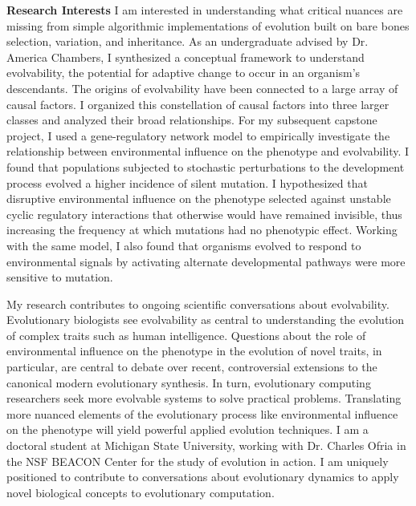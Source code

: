 \textbf{Research Interests}
I am interested in understanding what critical nuances are missing from simple algorithmic implementations of evolution built on bare bones selection, variation, and inheritance.
As an undergraduate advised by Dr. America Chambers, I synthesized a conceptual framework to understand evolvability, the potential for adaptive change to occur in an organism's descendants.
The origins of evolvability have been connected to a large array of causal factors.
I organized this constellation of causal factors into three larger classes and analyzed their broad relationships.
For my subsequent capstone project, I used a gene-regulatory network model to empirically investigate the relationship between environmental influence on the phenotype and evolvability.
I found that populations subjected to stochastic perturbations to the development process evolved a higher incidence of silent mutation.
I hypothesized that disruptive environmental influence on the phenotype selected against unstable cyclic regulatory interactions that otherwise would have remained invisible, thus increasing the frequency at which mutations had no phenotypic effect.
Working with the same model, I also found that organisms evolved to respond to environmental signals by activating alternate developmental pathways were more sensitive to mutation.

My research contributes to ongoing scientific conversations about evolvability.
Evolutionary biologists see evolvability as central to understanding the evolution of complex traits such as human intelligence.
Questions about the role of environmental influence on the phenotype in the evolution of novel traits, in particular, are central to debate over recent, controversial extensions to the canonical modern evolutionary synthesis.
In turn, evolutionary computing researchers seek more evolvable systems to solve practical problems.
Translating more nuanced elements of the evolutionary process like environmental influence on the phenotype will yield powerful applied evolution techniques.
I am a doctoral student at Michigan State University, working with Dr. Charles Ofria in the NSF BEACON Center for the study of evolution in action.
I am uniquely positioned to contribute to conversations about evolutionary dynamics to apply novel biological concepts to evolutionary computation.
